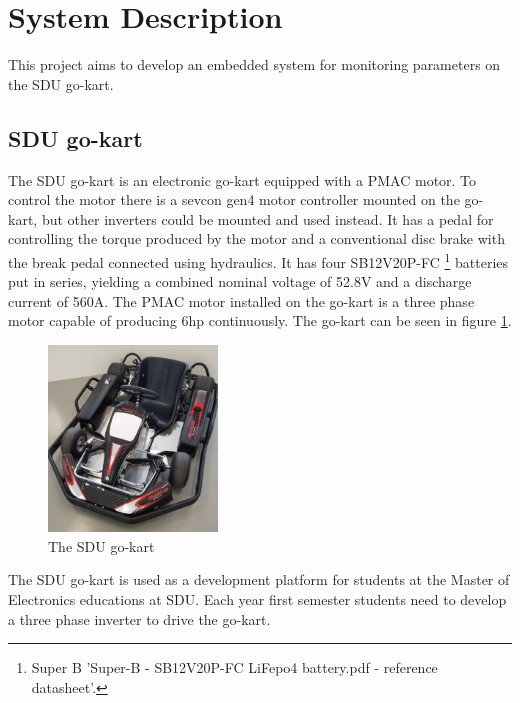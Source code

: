 \section{System Description}
\label{sec:system_description}
This project aims to develop an embedded system for monitoring parameters on the SDU go-kart.
\subsection{SDU go-kart}
The SDU go-kart is an electronic go-kart equipped with a PMAC motor. 
To control the motor there is a sevcon gen4 motor controller mounted on the go-kart, but other inverters could be mounted and used instead.
It has a pedal for controlling the torque produced by the motor and a conventional disc brake with the break pedal connected using hydraulics.
It has four SB12V20P-FC \footnote{Super B 'Super-B - SB12V20P-FC LiFepo4 battery.pdf - reference datasheet'.} batteries put in series, yielding a combined nominal voltage of 52.8V and a discharge current of 560A.
The PMAC motor installed on the go-kart is a three phase motor capable of producing 6hp continuously.
The go-kart can be seen in figure \ref{fig:go_kart}.

\begin{figure}[h]
 	\centering
    \includegraphics[width=0.4\textwidth]{graphics/go_kart}
    \caption{The SDU go-kart}
    \label{fig:go_kart}
\end{figure}

The SDU go-kart is used as a development platform for students at the Master of Electronics educations at SDU.
Each year first semester students need to develop a three phase inverter to drive the go-kart.

